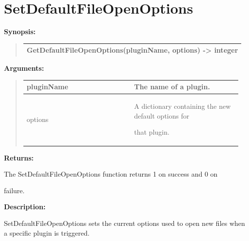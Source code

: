 \documentclass[letterpaper,10pt,english]{sphinxmanual}
\begin{document}
\section{SetDefaultFileOpenOptions}
\label{functions:setdefaultfileopenoptions}
\begin{DUlineblock}{0em}
\item[] \textbf{Synopsis:}
\end{DUlineblock}
\begin{quote}

\begin{tabulary}{\linewidth}{|L|}
\hline

GetDefaultFileOpenOptions(pluginName, options) -\textgreater{} integer
\\
\hline\end{tabulary}

\end{quote}

\begin{DUlineblock}{0em}
\item[] 
\item[] \textbf{Arguments:}
\end{DUlineblock}
\begin{quote}

\begin{tabular}{|p{0.475\linewidth}|p{0.475\linewidth}|}
\hline

pluginName
 & 
The name of a plugin.
\\
\hline
options
 & 
\begin{DUlineblock}{0em}
\item[] A dictionary containing the new default options for
\item[] that plugin.
\end{DUlineblock}
\\
\hline\end{tabular}

\end{quote}

\begin{DUlineblock}{0em}
\item[] 
\item[] \textbf{Returns:}
\item[] The SetDefaultFileOpenOptions function returns 1 on success and 0 on
\item[] failure.
\item[] 
\item[] \textbf{Description:}
\item[] SetDefaultFileOpenOptions sets the current options used to open new
files when a specific plugin is triggered.
\end{DUlineblock}
\end{document}
